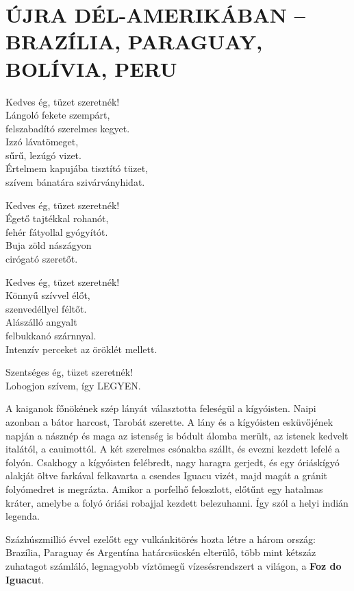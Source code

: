 \clearpage
\chapter{ÚJRA DÉL-AMERIKÁBAN -- BRAZÍLIA, PARAGUAY, BOLÍVIA, PERU}

\begin{Verse}
Kedves ég, tüzet szeretnék!		\\
Lángoló fekete szempárt,		\\
felszabadító szerelmes kegyet.		\\
Izzó lávatömeget,			\\
sűrű, lezúgó vizet.			\\
Értelmem kapujába tisztító tüzet,	\\
szívem bánatára szivárványhidat.

Kedves ég, tüzet szeretnék!		\\
Égető tajtékkal rohanót,		\\
fehér fátyollal gyógyítót.		\\
Buja zöld nászágyon			\\
cirógató szeretőt.

Kedves ég, tüzet szeretnék!		\\
Könnyű szívvel élőt,			\\
szenvedéllyel féltőt.			\\
Alászálló angyalt			\\
felbukkanó szárnnyal.			\\
Intenzív perceket az öröklét mellett.

Szentséges ég, tüzet szeretnék!		\\
Lobogjon szívem, így LEGYEN.
\end{Verse}

\clearpage
A kaiganok főnökének szép lányát választotta feleségül a kígyóisten.
Naipi azonban a bátor harcost, Tarobát szerette. A lány és a kígyóisten
esküvőjének napján a násznép és maga az istenség is bódult álomba
merült, az istenek kedvelt italától, a cauimottól. A két szerelmes csónakba
szállt, és evezni kezdett lefelé a folyón. Csakhogy a kígyóisten
felébredt, nagy haragra gerjedt, és egy óriáskígyó alakját öltve farkával
felkavarta a csendes Iguacu vizét, majd magát a gránit folyómedret is
megrázta. Amikor a porfelhő feloszlott, előtűnt egy hatalmas kráter,
amelybe a folyó óriási robajjal kezdett belezuhanni. Így szól a helyi
indián legenda.

Százhúszmillió évvel ezelőtt egy vulkánkitörés hozta létre a három
ország: Brazília, Paraguay és Argentína határcsücskén elterülő, több
mint kétszáz zuhatagot számláló, legnagyobb víztömegű vízesésrendszert
a világon, a \textbf{Foz do Iguacu}t.
